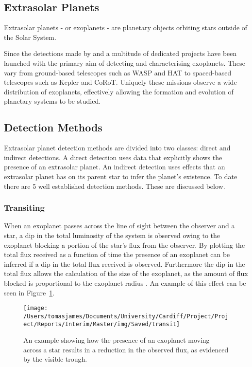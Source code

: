 \documentclass{report}
\begin{document}
\subsection{Extrasolar Planets}
Extrasolar planets - or exoplanets - are planetary objects orbiting stars outside of the Solar System.  

Since the detections made by \citeauthor{first} and \citeauthor{MQ} a multitude of dedicated projects have been launched with the primary aim of detecting and characterising exoplanets. These vary from ground-based telescopes such as WASP and HAT to spaced-based telescopes such as Kepler and CoRoT. Uniquely these missions observe a wide distribution of exoplanets, effectively allowing the formation and evolution of planetary systems to be studied. 

\subsection{Detection Methods}
Extrasolar planet detection methods are divided into two classes: direct and indirect detections. A direct detection uses data that explicitly shows the presence of an extrasolar planet. An indirect detection uses effects that an extrasolar planet has on its parent star to infer the planet's existence. To date there are 5 well established detection methods. These are discussed below.  

\subsubsection{Transiting}
When an exoplanet passes across the line of sight between the observer and a star, a dip in the total luminosity of the system is observed owing to the exoplanet blocking a portion of the star's flux from the observer. By plotting the total flux received as a function of time the presence of an exoplanet can be inferred if a dip in the total flux received is observed. Furthermore the dip in the total flux allows the calculation of the size of the exoplanet, as the amount of flux blocked is proportional to the exoplanet radius \parencite{radius}. An example of this effect can be seen in Figure~\ref{Transit}.

\begin{figure}[H]
\centering
    \texttt{[image: /Users/tomasjames/Documents/University/Cardiff/Project/Project/Reports/Interim/Master/img/Saved/transit]}
\caption[An example showing how the presence of an exoplanet moving across a star results in a reduction in the observed flux, as evidenced by the visible trough.]{An example showing how the presence of an exoplanet moving across a star results in a reduction in the observed flux, as evidenced by the visible trough. \parencite{transitimg}}\label{Transit}
\end{figure}
\end{document}
